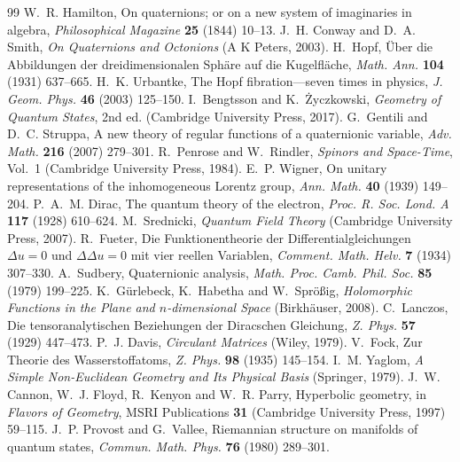 \backmatter
\begin{thebibliography}{99}
 W.~R. Hamilton, On quaternions; or on a new system of imaginaries in algebra, \emph{Philosophical Magazine} \textbf{25} (1844) 10--13.
 J.~H. Conway and D.~A. Smith, \emph{On Quaternions and Octonions} (A K Peters, 2003).
 H.~Hopf, \"Uber die Abbildungen der dreidimensionalen Sph\"are auf die Kugelfl\"ache, \emph{Math. Ann.} \textbf{104} (1931) 637--665.
 H.~K. Urbantke, The Hopf fibration---seven times in physics, \emph{J. Geom. Phys.} \textbf{46} (2003) 125--150.
 I.~Bengtsson and K.~\.Zyczkowski, \emph{Geometry of Quantum States}, 2nd ed. (Cambridge University Press, 2017).
 G.~Gentili and D.~C. Struppa, A new theory of regular functions of a quaternionic variable, \emph{Adv. Math.} \textbf{216} (2007) 279--301.
 R.~Penrose and W.~Rindler, \emph{Spinors and Space-Time}, Vol.~1 (Cambridge University Press, 1984).
 E.~P. Wigner, On unitary representations of the inhomogeneous Lorentz group, \emph{Ann. Math.} \textbf{40} (1939) 149--204.
 P.~A.~M. Dirac, The quantum theory of the electron, \emph{Proc. R. Soc. Lond. A} \textbf{117} (1928) 610--624.
 M.~Srednicki, \emph{Quantum Field Theory} (Cambridge University Press, 2007).
 R.~Fueter, Die Funktionentheorie der Differentialgleichungen $\Delta u=0$ und $\Delta\Delta u=0$ mit vier reellen Variablen, \emph{Comment. Math. Helv.} \textbf{7} (1934) 307--330.
 A.~Sudbery, Quaternionic analysis, \emph{Math. Proc. Camb. Phil. Soc.} \textbf{85} (1979) 199--225.
 K.~G\"urlebeck, K.~Habetha and W.~Spr\"o\ss ig, \emph{Holomorphic Functions in the Plane and $n$-dimensional Space} (Birkh\"auser, 2008).
 C.~Lanczos, Die tensoranalytischen Beziehungen der Diracschen Gleichung, \emph{Z. Phys.} \textbf{57} (1929) 447--473.
 P.~J. Davis, \emph{Circulant Matrices} (Wiley, 1979).
 V.~Fock, Zur Theorie des Wasserstoffatoms, \emph{Z. Phys.} \textbf{98} (1935) 145--154.
 I.~M. Yaglom, \emph{A Simple Non-Euclidean Geometry and Its Physical Basis} (Springer, 1979).
 J.~W. Cannon, W.~J. Floyd, R.~Kenyon and W.~R. Parry, Hyperbolic geometry, in \emph{Flavors of Geometry}, MSRI Publications \textbf{31} (Cambridge University Press, 1997) 59--115.
 J.~P. Provost and G.~Vallee, Riemannian structure on manifolds of quantum states, \emph{Commun. Math. Phys.} \textbf{76} (1980) 289--301.

\end{thebibliography}
